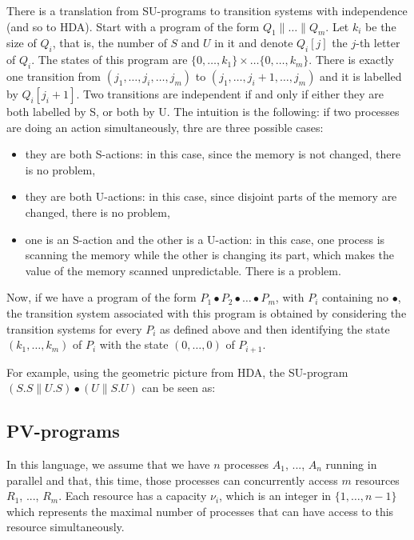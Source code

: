 There is a translation from SU-programs to transition systems with independence (and so to HDA). Start with a program of the form $Q_1\parallel \ldots \parallel Q_m$. Let $k_i$ be the size of $Q_i$, that is, the number of $S$ and $U$ in it and denote $Q_i[j]$ the $j$-th letter of $Q_i$. The states of this program are $\{0, \ldots, k_1\}\times\ldots\{0,\ldots, k_m\}$. There is exactly one transition from $(j_1, \ldots, j_i, \ldots, j_m)$ to $(j_1, \ldots, j_i +1, \ldots, j_m)$ and it is labelled by $Q_i[j_i+1]$. Two transitions are independent if and only if either they are both labelled by S, or both by U. The intuition is the following: if two processes are doing an action simultaneously, thre are three possible cases:
\begin{itemize}
	\item they are both S-actions: in this case, since the memory is not changed, there is no problem,
	\item they are both U-actions: in this case, since disjoint parts of the memory are changed, there is no problem,
	\item one is an S-action and the other is a U-action: in this case, one process is scanning the memory while the other is changing its part, which makes the value of the memory scanned unpredictable. There is a problem.
\end{itemize}
Now, if we have a program of the form $P_1\bullet P_2 \bullet \ldots \bullet P_m$, with $P_i$ containing no $\bullet$, the transition system associated with this program is obtained by considering the transition systems for every $P_i$ as defined above and then identifying the state $(k_1, \ldots, k_m)$ of $P_i$ with the state $(0, \ldots, 0)$ of $P_{i+1}$.

For example, using the geometric picture from HDA, the SU-program $(S.S\parallel U.S)\bullet(U\parallel S.U)$ can be seen as:

				\begin{figure}[H]
					\begin{center}
    						
  					\end{center}
				\end{figure}
				 

	\subsection{PV-programs}
	
In this language, we assume that we have $n$ processes $A_1$, ..., $A_n$ running in parallel and that, this time, those processes can concurrently access $m$ resources $R_1$, ..., $R_m$. Each resource has a capacity $\nu_i$, which is an integer in $\{1,\ldots, n-1\}$ which represents the maximal number of processes that can have access to this resource simultaneously.

